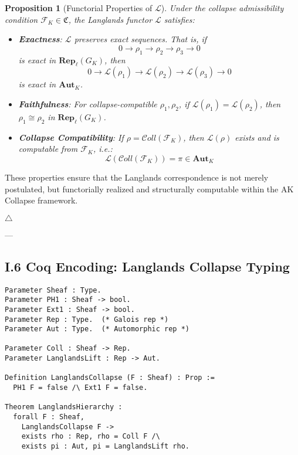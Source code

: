 \documentclass[11pt]{article}
\newtheorem{proposition}[theorem]{Proposition}
\begin{document}
\begin{proposition}[Functorial Properties of $\mathcal{L}$]
Under the collapse admissibility condition \( \mathcal{F}_K \in \mathfrak{C} \), the Langlands functor \( \mathcal{L} \) satisfies:

\begin{itemize}
  \item[\textbf{(F1)}] \textbf{Exactness}:  
  $\mathcal{L}$ preserves exact sequences. That is, if
  \[
  0 \to \rho_1 \to \rho_2 \to \rho_3 \to 0
  \]
  is exact in \( \mathbf{Rep}_\ell(G_K) \), then
  \[
  0 \to \mathcal{L}(\rho_1) \to \mathcal{L}(\rho_2) \to \mathcal{L}(\rho_3) \to 0
  \]
  is exact in \( \mathbf{Aut}_K \).

  \item[\textbf{(F2)}] \textbf{Faithfulness}:  
  For collapse-compatible \( \rho_1, \rho_2 \), if \( \mathcal{L}(\rho_1) = \mathcal{L}(\rho_2) \), then \( \rho_1 \cong \rho_2 \) in \( \mathbf{Rep}_\ell(G_K) \).

  \item[\textbf{(F3)}] \textbf{Collapse Compatibility}:  
  If \( \rho = \mathcal{C}oll(\mathcal{F}_K) \), then \( \mathcal{L}(\rho) \) exists and is computable from \( \mathcal{F}_K \), i.e.:
  \[
  \mathcal{L}(\mathcal{C}oll(\mathcal{F}_K)) = \pi \in \mathbf{Aut}_K
  \]
\end{itemize}
\end{proposition}

These properties ensure that the Langlands correspondence is not merely postulated, but functorially realized and structurally computable within the AK Collapse framework.

\hfill $\triangle$

---

\subsection*{I.6 Coq Encoding: Langlands Collapse Typing}
\label{sec:coq-langlands-hierarchy}

\begin{lstlisting}[language=Coq, caption={Coq Encoding: Langlands Collapse Hierarchy}]
Parameter Sheaf : Type.
Parameter PH1 : Sheaf -> bool.
Parameter Ext1 : Sheaf -> bool.
Parameter Rep : Type.  (* Galois rep *)
Parameter Aut : Type.  (* Automorphic rep *)

Parameter Coll : Sheaf -> Rep.
Parameter LanglandsLift : Rep -> Aut.

Definition LanglandsCollapse (F : Sheaf) : Prop :=
  PH1 F = false /\ Ext1 F = false.

Theorem LanglandsHierarchy :
  forall F : Sheaf,
    LanglandsCollapse F ->
    exists rho : Rep, rho = Coll F /\
    exists pi : Aut, pi = LanglandsLift rho.
\end{lstlisting}
\end{document}
